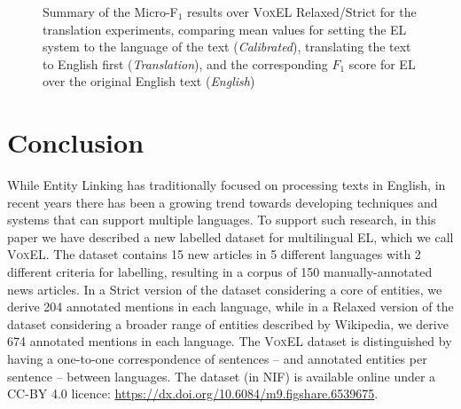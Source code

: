 \documentclass{llncs}
\begin{document}
\begin{figure}[t]
{
}
\caption{Summary of the Micro-F$_1$ results over \textsc{VoxEL} Relaxed/Strict for the translation experiments, comparing mean values for setting the EL system to the language of the text (\textit{Calibrated}), translating the text to English first (\textit{Translation}), and the corresponding $F_1$ score for EL over the original English text (\textit{English})}
\label{fig:bars}
\end{figure}


\section{Conclusion}
\label{sec:conclusion}

While Entity Linking has traditionally focused on processing texts in English, in recent years there has been a growing trend towards developing techniques and systems that can support multiple languages. To support such research, in this paper we have described a new labelled dataset for multilingual EL, which we call \textsc{VoxEL}. The dataset contains 15 new articles in 5 different languages with 2 different criteria for labelling, resulting in a corpus of 150 manually-annotated news articles. In a Strict version of the dataset considering a core of entities, we derive 204 annotated mentions in each language, while in a Relaxed version of the dataset considering a broader range of entities described by Wikipedia, we derive 674 annotated mentions in each language. The \textsc{VoxEL} dataset is distinguished by having a one-to-one correspondence of sentences -- and annotated entities per sentence -- between languages. The dataset (in NIF) is available online under a CC-BY 4.0 licence: \url{https://dx.doi.org/10.6084/m9.figshare.6539675}.
\end{document}
